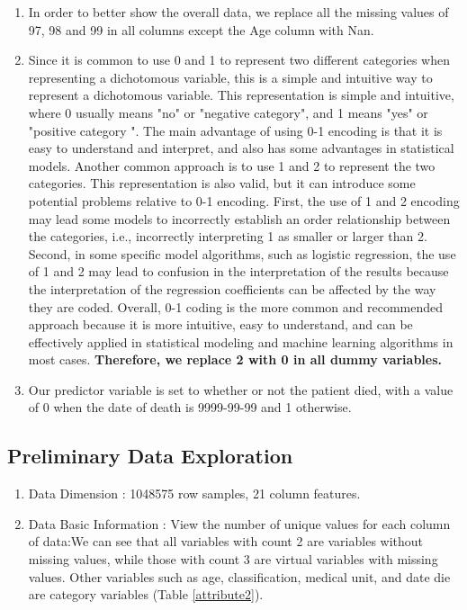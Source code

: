 \documentclass[
  journal=medium,
  manuscript=Report,
  year=2023,
  volume=37,
]{cup-journal}
\begin{document}
\begin{enumerate}
    \item In order to better show the overall data, we replace all the missing values of 97, 98 and 99 in all columns except the Age column with Nan.
    \item Since it is common to use 0 and 1 to represent two different categories when representing a dichotomous variable, this is a simple and intuitive way to represent a dichotomous variable. This representation is simple and intuitive, where 0 usually means "no" or "negative category", and 1 means "yes" or "positive category ". The main advantage of using 0-1 encoding is that it is easy to understand and interpret, and also has some advantages in statistical models. Another common approach is to use 1 and 2 to represent the two categories. This representation is also valid, but it can introduce some potential problems relative to 0-1 encoding. First, the use of 1 and 2 encoding may lead some models to incorrectly establish an order relationship between the categories, i.e., incorrectly interpreting 1 as smaller or larger than 2. Second, in some specific model algorithms, such as logistic regression, the use of 1 and 2 may lead to confusion in the interpretation of the results because the interpretation of the regression coefficients can be affected by the way they are coded. Overall, 0-1 coding is the more common and recommended approach because it is more intuitive, easy to understand, and can be effectively applied in statistical modeling and machine learning algorithms in most cases. \textbf{Therefore, we replace 2 with 0 in all dummy variables.}
    \item Our predictor variable is set to whether or not the patient died, with a value of 0 when the date of death is 9999-99-99 and 1 otherwise.
\end{enumerate}

\subsection{Preliminary Data Exploration}

\begin{enumerate}
    \item Data Dimension : 1048575 row samples, 21 column features.
    \item Data Basic Information : View the number of unique values for each column of data:We can see that all variables with count 2 are variables without missing values, while those with count 3 are virtual variables with missing values. Other variables such as age, classification, medical unit, and date die are category variables (Table \ref{attribute2}).
\end{enumerate}
\end{document}
